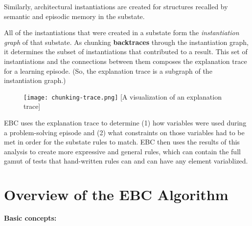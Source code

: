 Similarly, architectural instantiations are created for structures recalled by semantic and episodic memory in the substate.

All of the instantiations that were created in a substate form the \textit{instantiation graph} of that substate.  As chunking \textbf{backtraces} through the instantiation graph, it determines the subset of instantiations that contributed to a result.  This set of instantiations and the connections between them composes the explanation trace for a learning episode.  (So, the explanation trace is a subgraph of the instantiation graph.)

\begin{figure}[!h]
	\centering
	\texttt{[image: chunking-trace.png]}
	[A visualization of an explanation trace]
	\label{fig:chunking-trace}
\end{figure}

EBC uses the explanation trace to determine (1) how variables were used during a problem-solving episode and (2) what constraints on those variables had to be met in order for the substate rules to match.  EBC then uses the results of this analysis to create more expressive and general rules, which can contain the full gamut of tests that hand-written rules can and can have any element variablized.


\section{Overview of the EBC Algorithm}
\label{CHUNKING-ebc}

\textbf{Basic concepts:}

